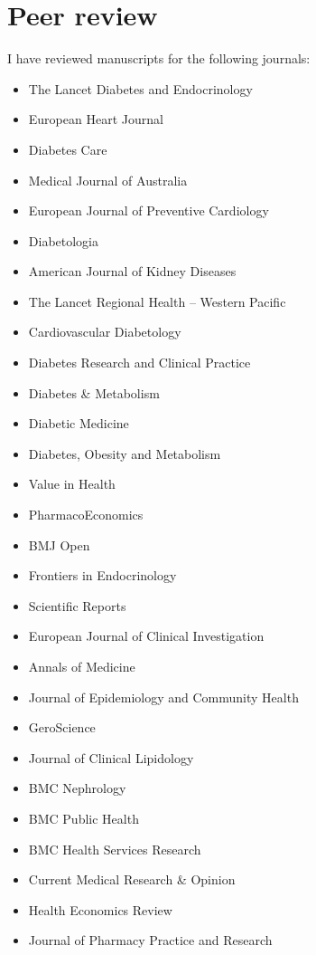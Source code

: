 \documentclass[11pt]{article}
\begin{document}
\section*{Peer review}
I have reviewed manuscripts for the following journals:
\begin{itemize}
\item The Lancet Diabetes and Endocrinology 
\item European Heart Journal 
\item Diabetes Care 
\item Medical Journal of Australia 
\item European Journal of Preventive Cardiology
\item Diabetologia 
\item American Journal of Kidney Diseases 
\item The Lancet Regional Health – Western Pacific 
\item Cardiovascular Diabetology 
\item Diabetes Research and Clinical Practice 
\item Diabetes \& Metabolism 
\item Diabetic Medicine 
\item Diabetes, Obesity and Metabolism 
\item Value in Health 
\item PharmacoEconomics 
\item BMJ Open 
\item Frontiers in Endocrinology 
\item Scientific Reports 
\item European Journal of Clinical Investigation 
\item Annals of Medicine 
\item Journal of Epidemiology and Community Health 
\item GeroScience
\item Journal of Clinical Lipidology 
\item BMC Nephrology 
\item BMC Public Health 
\item BMC Health Services Research 
\item Current Medical Research  \& Opinion 
\item Health Economics Review 
\item Journal of Pharmacy Practice and Research 
\end{itemize}
\end{document}
